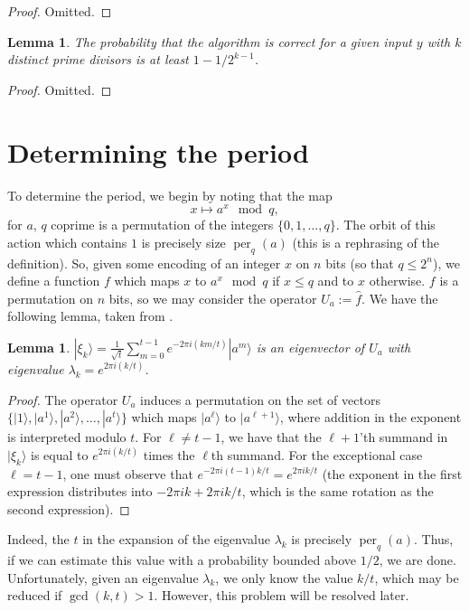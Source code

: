 \documentclass{amsart}
\DeclareMathOperator{\per}{per}
\newtheorem{lemma}[theorem]{Lemma}
\theoremstyle{definition}
\theoremstyle{remark}
\newcommand{\ket}[1] {|#1\rangle}
\begin{document}
\begin{proof}
    Omitted.
\end{proof}

\begin{lemma}
    The probability that the algorithm is correct for a given input $y$ with $k$
    distinct prime divisors is at least $1 - 1/2^{k-1}$.
\end{lemma}

\begin{proof}
    Omitted.
\end{proof}

\section{Determining the period}

To determine the period, we begin by noting that the map
\[
    x \mapsto a^x \mod q,
\]
for $a$, $q$ coprime is a permutation of the integers $\{0, 1, \dots, q\}$. The
orbit of this action which contains $1$ is precisely size $\per_q(a)$ (this is a
rephrasing of the definition). So, given some encoding of an integer $x$ on $n$
bits (so that $q \leq 2^n$), we define a function $f$ which maps $x$ to $a^x \mod
q$ if $x \leq q$ and to $x$ otherwise. $f$ is a permutation on $n$ bits, so we
may consider the operator $U_a := \widehat{f}$. We have the following lemma,
taken from \cite{hw012}.

\begin{lemma}
    $\displaystyle \ket{\xi_k} =
    \frac{1}{\sqrt{t}}\sum_{m=0}^{t-1} e^{-2 \pi i (km/t)} \ket{a^m}$ is an
    eigenvector of $U_a$ with eigenvalue $\lambda_k = e^{2\pi i (k/t)}$.
\end{lemma}

\begin{proof}
    The operator $U_a$ induces a permutation on the set of vectors $\{\ket{1},
    \ket{a^1}, \ket{a^2}, \dots, \ket{a^t}\}$ which maps $\ket{a^\ell}$ to
    $\ket{a^{\ell+1}}$, where addition in the exponent is interpreted modulo
    $t$.  For $\ell \neq t-1$, we have that the $\ell + 1$'th summand in
    $\ket{\xi_k}$ is equal to $e^{2\pi i(k/t)}$ times the $\ell$th summand.  For
    the exceptional case $\ell = t-1$, one must observe that $e^{-2\pi i (t -
        1)k/t} = e^{2\pi i k/t}$ (the exponent in the first expression
    distributes into $-2\pi i k + 2\pi i k/t$, which is the same rotation as the
    second expression).
\end{proof}

Indeed, the $t$ in the expansion of the eigenvalue $\lambda_k$ is precisely
$\per_q(a)$. Thus, if we can estimate this value with a probability bounded
above $1/2$, we are done. Unfortunately, given an eigenvalue $\lambda_k$, we
only know the value $k/t$, which may be reduced if $\gcd(k, t) > 1$. However,
this problem will be resolved later.
\end{document}
